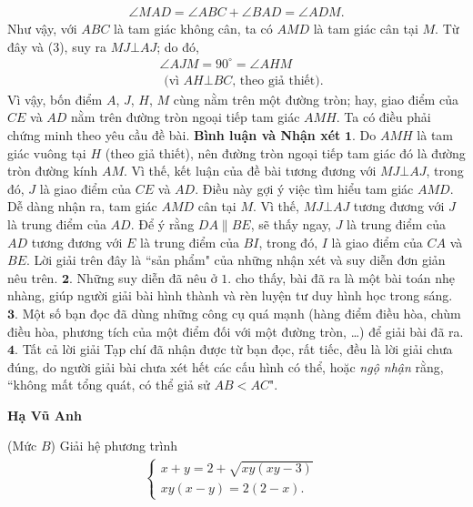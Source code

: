 \begin{multicols}{2}
	\begin{align*}
		\angle MAD = \angle ABC + \angle BAD = \angle ADM.
	\end{align*}
	Như vậy, với $ABC$ là tam giác không cân, ta có $AMD$ là tam giác cân tại $M$. Từ đây và ($3$), suy ra $MJ \bot AJ$; do đó,
	\begin{align*}
		&\angle AJM = 90^\circ = \angle AHM \\
		&\text{ (vì $AH \bot BC$, theo giả thiết).}
	\end{align*}
	Vì vậy, bốn điểm $A$, $J$, $H$, $M$ cùng nằm trên một đường tròn; hay, giao điểm của $CE$ và $AD$ nằm trên đường tròn ngoại tiếp tam giác $AMH$. Ta có điều phải chứng minh theo yêu cầu đề bài.
	\vskip 0.05cm
	\textbf{\color{thachthuctoanhoc}Bình luận và Nhận xét}
	\vskip 0.05cm
	$\pmb{1.}$ Do $AMH$ là tam giác vuông tại $H$ (theo giả thiết), nên đường tròn ngoại tiếp tam giác đó là đường tròn đường kính $AM$. Vì thế, kết luận của đề bài tương đương với $MJ \bot AJ$, trong đó, $J$ là giao điểm của $CE$ và $AD$. Điều này gợi ý việc tìm hiểu tam giác $AMD$.
	\vskip 0.05cm
	Dễ dàng nhận ra, tam giác $AMD$ cân tại $M$. Vì thế, $MJ \bot AJ$ tương đương với $J$ là trung điểm của $AD$.
	\vskip 0.05cm
	Để ý rằng $DA \parallel BE$, sẽ thấy ngay, $J$ là trung điểm của $AD$ tương đương với $E$ là trung điểm của $BI$, trong đó, $I$ là giao điểm của $CA$ và $BE$.
	\vskip 0.05cm
	Lời giải trên đây là ``sản phẩm" của những nhận xét và suy diễn đơn giản nêu trên.
	\vskip 0.05cm
	$\pmb{2.}$ Những suy diễn đã nêu ở $1$. cho thấy, bài đã ra là một bài toán nhẹ nhàng, giúp người giải bài hình thành và rèn luyện tư duy hình học trong sáng.
	\vskip 0.05cm
	$\pmb{3.}$ Một số bạn đọc đã dùng những công cụ quá mạnh (hàng điểm điều hòa, chùm điều hòa, phương tích của một điểm đối với một đường tròn, \ldots) để giải bài đã ra.
	\vskip 0.05cm
	$\pmb{4.}$ Tất cả lời giải Tạp chí đã nhận được từ bạn đọc, rất tiếc, đều là lời giải chưa đúng, do người giải bài chưa xét hết các cấu hình có thể, hoặc \textit{ngộ nhận} rằng, ``không mất tổng quát, có thể giả sử $AB < AC$".
	\begin{flushright}
		\textbf{\color{thachthuctoanhoc}Hạ Vũ Anh}
	\end{flushright}
	{}
	(Mức $B$) Giải hệ phương trình 
	\begin{align*}
		\begin{cases}
			x+y=2+\sqrt{xy(xy-3)}&\\
			xy(x-y)=2(2-x).
		\end{cases}
	\end{align*}

\end{multicols}
